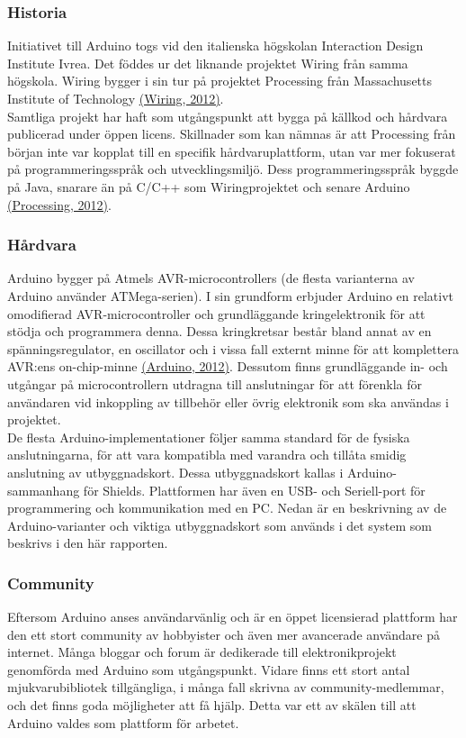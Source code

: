 \documentclass[a4paper,11pt]{article}
\begin{document}
\subsubsection{Historia}
Initiativet till Arduino togs vid den italienska högskolan Interaction Design Institute Ivrea. Det föddes ur det liknande projektet Wiring från samma högskola. Wiring bygger i sin tur på projektet Processing från Massachusetts Institute of Technology \hyperref[wiring]{(Wiring, 2012)}. \\

Samtliga projekt har haft som utgångspunkt att bygga på källkod och hårdvara publicerad under öppen licens. Skillnader som kan nämnas är att Processing från början inte var kopplat till en specifik hårdvaruplattform, utan var mer fokuserat på programmeringsspråk och utvecklingsmiljö. Dess programmeringsspråk byggde på Java, snarare än på C/C++ som Wiringprojektet och senare Arduino \hyperref[processing]{(Processing, 2012)}.

\subsubsection{Hårdvara}
Arduino bygger på Atmels AVR-microcontrollers (de flesta varianterna av Arduino använder ATMega-serien). I sin grundform erbjuder Arduino en relativt omodifierad AVR-microcontroller och grundläggande kringelektronik för att stödja och programmera denna. Dessa kringkretsar består bland annat av en spänningsregulator, en oscillator och i vissa fall externt minne för att komplettera AVR:ens on-chip-minne  \hyperref[arduino]{(Arduino, 2012)}. Dessutom finns grundläggande in- och utgångar på microcontrollern utdragna till anslutningar för att förenkla för användaren vid inkoppling av tillbehör eller övrig elektronik som ska användas i projektet. \\

De flesta Arduino-implementationer följer samma standard för de fysiska anslutningarna, för att vara kompatibla med varandra och tillåta smidig anslutning av utbyggnadskort. Dessa utbyggnadskort kallas i Arduino-sammanhang för Shields. Plattformen har även en USB- och Seriell-port för programmering och kommunikation med en PC. Nedan är en beskrivning av de Arduino-varianter och viktiga utbyggnadskort som används i det system som beskrivs i den här rapporten.

\subsubsection{Community}
Eftersom Arduino anses användarvänlig och är en öppet licensierad plattform har den ett stort community av hobbyister och även mer avancerade användare på internet. Många bloggar och forum är dedikerade till elektronikprojekt genomförda med Arduino som utgångspunkt. Vidare finns ett stort antal mjukvarubibliotek tillgängliga, i många fall skrivna av community-medlemmar, och det finns goda möjligheter att få hjälp. Detta var ett av skälen till att Arduino valdes som plattform för arbetet. \\
\end{document}
